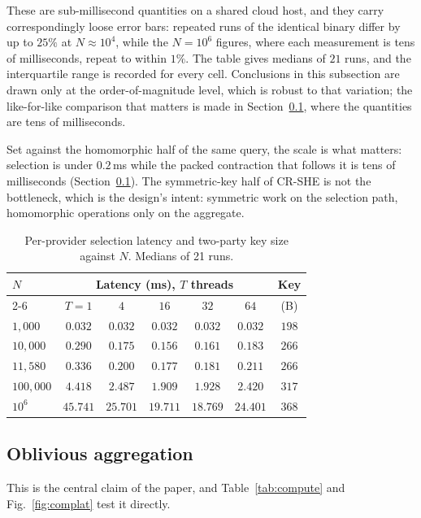 \documentclass[a4paper,fleqn]{cas-dc}
\begin{document}
These are sub-millisecond quantities on a shared cloud host, and they carry
correspondingly loose error bars: repeated runs of the identical binary differ
by up to $25\%$ at $N\approx10^4$, while the $N=10^6$ figures, where each
measurement is tens of milliseconds, repeat to within $1\%$. The table gives
medians of $21$ runs, and the interquartile range is recorded for every
cell. Conclusions in this subsection are drawn only at the
order-of-magnitude level, which is robust to that variation; the like-for-like
comparison that matters is made in Section~\ref{sec:aggresult}, where the
quantities are tens of milliseconds.

Set against the homomorphic half of the same query, the scale is what matters:
selection is under $0.2$\,ms while the packed contraction that follows it is
tens of milliseconds (Section~\ref{sec:aggresult}). The symmetric-key half of
CR-SHE is not the bottleneck, which is the design's intent: symmetric work on
the selection path, homomorphic operations only on the aggregate.

\begin{table}[pos=t]
\caption{Per-provider selection latency and two-party key size against $N$.
Medians of 21 runs.}
\label{tab:search}
\centering
\footnotesize
\setlength{\tabcolsep}{2pt}
\renewcommand{\arraystretch}{1.2}
\begin{tabular*}{\tblwidth}{@{\extracolsep{\fill}}lcccccc@{}}
\toprule
$N$ & \multicolumn{5}{c}{Latency (ms), $T$ threads} & Key \\
\cmidrule(lr){2-6}
    & $T=1$ & $4$ & $16$ & $32$ & $64$ & (B) \\
\midrule
$1{,}000$    & $0.032$  & $0.032$  & $0.032$  & $0.032$  & $0.032$  & $198$ \\
$10{,}000$   & $0.290$  & $0.175$  & $0.156$  & $0.161$  & $0.183$  & $266$ \\
$11{,}580$   & $0.336$  & $0.200$  & $0.177$  & $0.181$  & $0.211$  & $266$ \\
$100{,}000$  & $4.418$  & $2.487$  & $1.909$  & $1.928$  & $2.420$  & $317$ \\
$10^{6}$     & $45.741$ & $25.701$ & $19.711$ & $18.769$ & $24.401$ & $368$ \\
\bottomrule
\end{tabular*}
\end{table}

\subsection{Oblivious aggregation}
\label{sec:aggresult}
This is the central claim of the paper, and Table~\ref{tab:compute} and
Fig.~\ref{fig:complat} test it directly.
\end{document}
